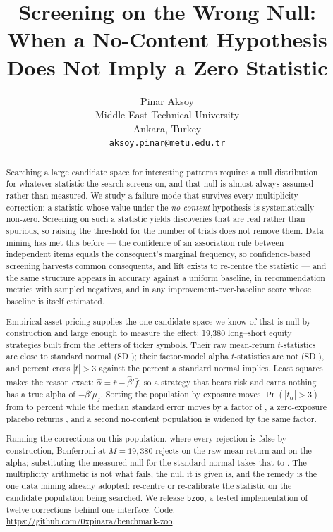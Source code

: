 \documentclass{article}
\title{Screening on the Wrong Null:\\
When a No-Content Hypothesis Does Not Imply a Zero Statistic}
\author{%
  Pinar Aksoy \\
  Middle East Technical University \\
  Ankara, Turkey \\
  \texttt{aksoy.pinar@metu.edu.tr} \\
}
\begin{document}
\maketitle

\begin{abstract}
Searching a large candidate space for interesting patterns requires a null
distribution for whatever statistic the search screens on, and that null is
almost always assumed rather than measured. We study a failure mode that
survives every multiplicity correction: a statistic whose value under the
\emph{no-content} hypothesis is systematically non-zero. Screening on such a
statistic yields discoveries that are real rather than spurious, so raising the
threshold for the number of trials does not remove them. Data mining has met
this before --- the confidence of an association rule between independent items
equals the consequent's marginal frequency, so confidence-based screening
harvests common consequents, and lift exists to re-centre the statistic --- and
the same structure appears in accuracy against a uniform baseline, in
recommendation metrics with sampled negatives, and in any
improvement-over-baseline score whose baseline is itself estimated.

Empirical asset pricing supplies the one candidate space we know of that is
null by construction and large enough to measure the effect: 19{,}380
long--short equity strategies built from the letters of ticker symbols. Their
raw mean-return $t$-statistics are close to standard normal
(SD \bzoonullMeanSdVw{}); their factor-model alpha $t$-statistics are not
(SD \bzoonullFfSdVw{}), and \bzooamThreeFfFiveVwPct{} percent cross $|t|>3$
against the \bzoonominalThreePct{} percent a standard normal implies. Least
squares makes the reason exact: $\hat\alpha = \bar r - \hat\beta'\bar f$, so a
strategy that bears risk and earns nothing has a true alpha of $-\beta'\mu_f$.
Sorting the population by exposure moves $\Pr(|t_\alpha|>3)$ from
\bzooamDecileOneThreePct{} to \bzooamDecileTenThreePct{} percent while the
median standard error moves by a factor of \bzooamDecileDenominatorRatio{}, a
zero-exposure placebo returns \bzooamPlaceboIid{}, and a second no-content
population is widened by the same factor.

Running the corrections on this population, where every rejection is false by
construction, Bonferroni at $M = 19{,}380$ rejects \bzooamBonfFalseMean{} on the
raw mean return and \bzooamBonfFalseAlpha{} on the alpha; substituting the
measured null for the standard normal takes that to
\bzooamMeasuredBonfFalse{}. The multiplicity arithmetic is not what fails, the
null it is given is, and the remedy is the one data mining already adopted:
re-centre or re-calibrate the statistic on the candidate population being
searched. We release \texttt{bzoo}, a tested implementation of twelve
corrections behind one interface.
Code: \url{https://github.com/0xpinara/benchmark-zoo}.
\end{abstract}
\end{document}
